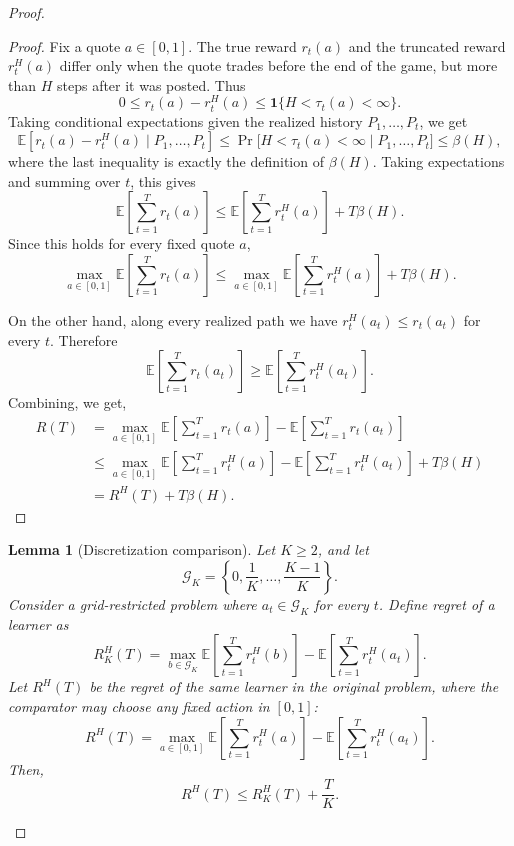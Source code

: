 \documentclass[11pt]{article}
\newtheorem{lemma}{Lemma}
\newcommand{\ind}[1]{\mathbf{1}\{#1\}}
\begin{document}
\begin{proof}
\begin{proof}
Fix a quote \(a \in [0,1]\). The true reward \(r_t(a)\) and the truncated
reward \(r^H_t(a)\) differ only when the quote trades before the end of the
game, but more than \(H\) steps after it was posted. Thus
\[
    0
    \leq
    r_t(a) - r^H_t(a)
    \leq
    \ind{H < \tau_t(a) < \infty}.
\]
Taking conditional expectations given the realized history \(P_1,\dots,P_t\),
we get
\[
    \mathbb{E}\left[
        r_t(a) - r^H_t(a)
        \mid P_1,\dots,P_t
    \right]
    \leq
    \Pr\bigl[H < \tau_t(a) < \infty \mid P_1,\dots,P_t\bigr]
    \leq
    \beta(H),
\]
where the last inequality is exactly the definition of \(\beta(H)\). Taking
expectations and summing over \(t\), this gives
\[
    \mathbb{E}\left[\sum_{t=1}^T r_t(a)\right]
    \leq
    \mathbb{E}\left[\sum_{t=1}^T r^H_t(a)\right]
    +
    T\beta(H).
\]
Since this holds for every fixed quote \(a\),
\[
    \max_{a \in [0,1]}
    \mathbb{E}\left[\sum_{t=1}^T r_t(a)\right]
    \leq
    \max_{a \in [0,1]}
    \mathbb{E}\left[\sum_{t=1}^T r^H_t(a)\right]
    +
    T\beta(H).
\]

On the other hand, along every realized path we have
\(r^H_t(a_t) \leq r_t(a_t)\) for every \(t\). Therefore
\[
    \mathbb{E}\left[\sum_{t=1}^T r_t(a_t)\right]
    \geq
    \mathbb{E}\left[\sum_{t=1}^T r^H_t(a_t)\right].
\]
Combining, we get, 
\[
\begin{aligned}
    R(T)
    &=
    \max_{a \in [0,1]}
    \mathbb{E}\left[\sum_{t=1}^T r_t(a)\right]
    -
    \mathbb{E}\left[\sum_{t=1}^T r_t(a_t)\right] \\
    &\leq
    \max_{a \in [0,1]}
    \mathbb{E}\left[\sum_{t=1}^T r^H_t(a)\right]
    -
    \mathbb{E}\left[\sum_{t=1}^T r^H_t(a_t)\right]
    +
    T\beta(H) \\
    &=
    R^H(T) + T\beta(H).
\end{aligned}
\]
\end{proof}

\begin{lemma}[Discretization comparison]\label{lem:discretization-comparison}
Let \(K \geq 2\), and let
\[
    \mathcal{G}_K
    =
    \left\{0, \frac{1}{K}, \dots, \frac{K-1}{K}\right\}.
\]
Consider a grid-restricted problem where \(a_t \in
\mathcal{G}_K\) for every \(t\). Define regret of a learner as
\[
    R^H_K(T)
    =
    \max_{b \in \mathcal{G}_K}
    \mathbb{E}\left[\sum_{t=1}^T r^H_t(b)\right]
    -
    \mathbb{E}\left[\sum_{t=1}^T r^H_t(a_t)\right].
\]
Let \(R^H(T)\) be the regret of the same learner in the original
problem, where the comparator may choose any fixed action in \([0,1]\):
\[
    R^H(T)
    =
    \max_{a \in [0,1]}
    \mathbb{E}\left[\sum_{t=1}^T r^H_t(a)\right]
    -
    \mathbb{E}\left[\sum_{t=1}^T r^H_t(a_t)\right].
\]
Then,
\[
    R^H(T) \leq R^H_K(T) + \frac{T}{K}.
\]
\end{lemma}


\end{proof}
\end{document}
